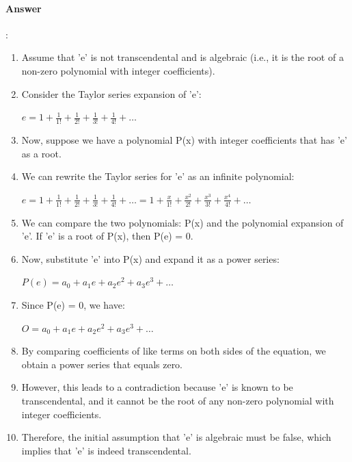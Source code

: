 \documentclass{article}
\begin{document}
\paragraph{Answer}:
\begin{enumerate}
  \item Assume that 'e' is not transcendental and is algebraic (i.e., it is the root of a non-zero polynomial with integer coefficients).

  \item Consider the Taylor series expansion of 'e':
  
  $e = 1 + \frac{1}{1!} + \frac{1}{2!} + \frac{1}{3!} + \frac{1}{4!} + \ldots$
  
  \item Now, suppose we have a polynomial P(x) with integer coefficients that has 'e' as a root.
  
  \item We can rewrite the Taylor series for 'e' as an infinite polynomial:
  
  $e = 1 + \frac{1}{1!} + \frac{1}{2!} + \frac{1}{3!} + \frac{1}{4!} + \ldots = 1 + \frac{x}{1!} + \frac{x^2}{2!}+ \frac{x^3}{3!} + \frac{x^4}{4!} + \ldots$
  
  \item We can compare the two polynomials: P(x) and the polynomial expansion of 'e'. If 'e' is a root of P(x), then P(e) = 0.
  
  \item Now, substitute 'e' into P(x) and expand it as a power series:
  
  $P(e) = a_0 + a_1e + a_2e^2 + a_3e^3 + \ldots$
  
  \item Since P(e) = 0, we have:
  
  $O = a_0 + a_1e + a_2e^2 + a_3e^3 + \ldots$
  
  \item By comparing coefficients of like terms on both sides of the equation, we obtain a power series that equals zero.
  
  \item However, this leads to a contradiction because 'e' is known to be transcendental, and it cannot be the root of any non-zero polynomial with integer coefficients.
  
  \item Therefore, the initial assumption that 'e' is algebraic must be false, which implies that 'e' is indeed transcendental.
\end{enumerate}
\end{document}
